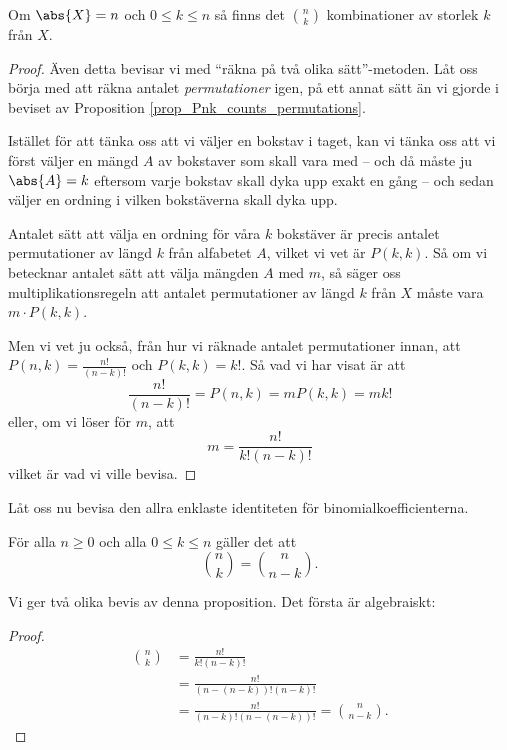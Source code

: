 \documentclass{tufte-handout}
\begin{document}
\begin{proposition}
	Om $\abs{X} = n$ och $0 \leq k \leq n$ så finns det $\binom{n}{k}$ kombinationer av storlek $k$ från $X$.
	\begin{proof}
		Även detta bevisar vi med ``räkna på två olika sätt''-metoden. Låt oss börja med att räkna antalet \emph{permutationer} igen, på ett annat sätt än vi gjorde i beviset av Proposition \ref{prop_Pnk_counts_permutations}.

		Istället för att tänka oss att vi väljer en bokstav i taget, kan vi tänka oss att vi först väljer en mängd $A$ av bokstaver som skall vara med -- och då måste ju $\abs{A} = k$ eftersom varje bokstav skall dyka upp exakt en gång -- och sedan väljer en ordning i vilken bokstäverna skall dyka upp.

		Antalet sätt att välja en ordning för våra $k$ bokstäver är precis antalet permutationer av längd $k$ från alfabetet $A$, vilket vi vet är $P(k,k)$. Så om vi betecknar antalet sätt att välja mängden $A$ med $m$, så säger oss multiplikationsregeln att antalet permutationer av längd $k$ från $X$ måste vara $m\cdot P(k,k)$.

		Men vi vet ju också, från hur vi räknade antalet permutationer innan, att $P(n,k) = \frac{n!}{(n-k)!}$ och $P(k,k) = k!$. Så vad vi har visat är att
		$$\frac{n!}{(n-k)!} = P(n,k) = m P(k,k) = m k!$$
		eller, om vi löser för $m$, att
		$$m = \frac{n!}{k!(n-k)!}$$
		vilket är vad vi ville bevisa.
	\end{proof}
\end{proposition}

Låt oss nu bevisa den allra enklaste identiteten för binomialkoefficienterna.

\begin{proposition}
	För alla $n \geq 0$ och alla $0 \leq k \leq n$ gäller det att
	$$\binom{n}{k} = \binom{n}{n-k}.$$
\end{proposition}

Vi ger två olika bevis av denna proposition. Det första är algebraiskt:
\begin{proof}
	\begin{align*}
		\binom{n}{k} &= \frac{n!}{k!(n-k)!}\\
		&= \frac{n!}{(n-(n-k))!(n-k)!}\\
		&= \frac{n!}{(n-k)!(n-(n-k))!} = \binom{n}{n-k}.
	\end{align*}
\end{proof}
\end{document}
